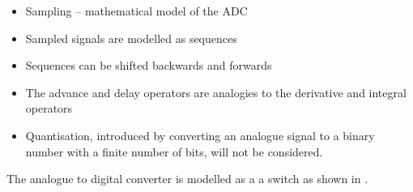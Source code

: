\begin{slide}\label{slide:l7s2a}
  \begin{itemize}
   \item Sampling -- mathematical model of the ADC
   \item Sampled signals are modelled as sequences
   \item Sequences can be shifted backwards and forwards
   \item The advance and delay operators are analogies to the derivative
     and integral operators
  \end{itemize}
\end{slide}

\begin{slide}\label{slide:l7s2}
  \begin{itemize}
   \item Quantisation, introduced by converting an analogue signal to a
     binary number with a finite number of bits, will not be considered.
  \end{itemize}
\end{slide}


The analogue to digital converter is modelled as a a switch as
shown in .

\ifslidesonly
\begin{slide}

\end{slide}
\fi


\ifslidesonly
\begin{slide}

\end{slide}
\fi


\begin{slide}\label{slide:l7s3}
\end{slide}

